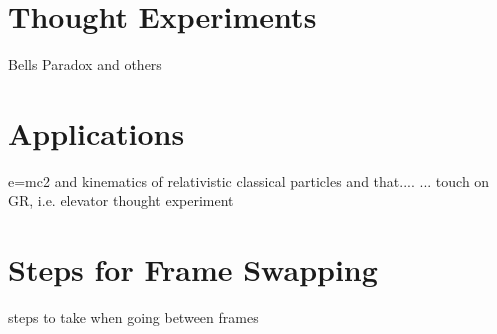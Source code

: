 \chapter{Thought Experiments}
Bells Paradox and others
\chapter{Applications}
e=mc2 and kinematics of relativistic classical particles and that....\newline
... touch on GR, i.e. elevator thought experiment
\chapter{Steps for Frame Swapping}

steps to take when going between frames